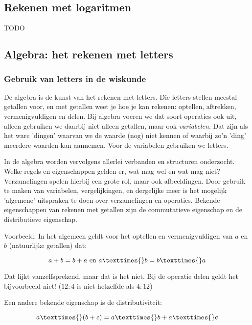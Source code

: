 \subsection{Rekenen met logaritmen}
TODO

\subsection{Algebra: het rekenen met letters}


\subsubsection{Gebruik van letters in de wiskunde}

De algebra is de kunst van het rekenen met letters. Die letters stellen
meestal getallen voor, en met getallen weet je hoe je kan rekenen:
optellen, aftrekken, vermenigvuldigen en delen. Bij algebra voeren
we dat soort operaties ook uit, alleen gebruiken we daarbij niet alleen
getallen, maar ook \emph{variabelen}. Dat zijn als het ware 'dingen'
waarvan we de waarde (nog) niet kennen of waarbij zo'n 'ding' meerdere
waarden kan aannemen. Voor de variabelen gebruiken we letters.

\noindent In de algebra worden vervolgens allerlei verbanden en structuren
onderzocht. Welke regels en eigenschappen gelden er, wat mag wel en
wat mag niet? Verzamelingen spelen hierbij een grote rol, maar ook
afbeeldingen. Door gebruik te maken van variabelen, vergelijkingen,
en dergelijke meer is het mogelijk 'algemene' uitspraken te doen over
verzamelingen en operaties. Bekende eigenschappen van rekenen met
getallen zijn de commutatieve eigenschap en de distributieve eigenschap.

\medskip{}

Voorbeeld: In het algemeen geldt voor het optellen en vermenigvuldigen
van $a$ en $b$ (natuurlijke getallen) dat:

\begin{equation*}
a + b = b + a \text{ en } a \texttimes{} b = b \texttimes{} a
\end{equation*}

Dat lijkt vanzelfsprekend, maar dat is het niet. Bij de operatie delen
geldt het bijvoorbeeld niet! ($12:4$ is niet hetzelfde als $4:12$)

\medskip{}

Een andere bekende eigenschap is de distributiviteit:

\begin{equation*}
a \texttimes{} (b + c) = a \texttimes{} b + a \texttimes{} c
\end{equation*}

